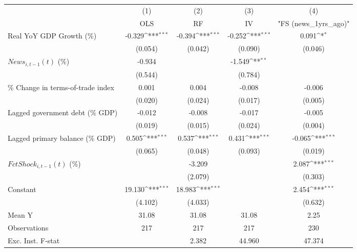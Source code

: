 {
\def\sym#1{\ifmmode^{#1}\else\(^{#1}\)\fi}
\begin{tabular}{l*{4}{c}}
\toprule
                    &\multicolumn{1}{c}{(1)}&\multicolumn{1}{c}{(2)}&\multicolumn{1}{c}{(3)}&\multicolumn{1}{c}{(4)}\\
                    &\multicolumn{1}{c}{OLS}&\multicolumn{1}{c}{RF}&\multicolumn{1}{c}{IV}&\multicolumn{1}{c}{ "FS (news_1yrs_ago)" }\\
\midrule
Real YoY GDP Growth (\%)&      -0.329\sym{***}&      -0.394\sym{***}&      -0.252\sym{***}&       0.091\sym{*}  \\
                    &     (0.054)         &     (0.042)         &     (0.090)         &     (0.046)         \\
\addlinespace
$ News_{i,t-1}(t)$ (\%)&      -0.934         &                     &      -1.549\sym{**} &                     \\
                    &     (0.544)         &                     &     (0.784)         &                     \\
\addlinespace
\% Change in terms-of-trade index&       0.001         &       0.004         &      -0.008         &      -0.006         \\
                    &     (0.020)         &     (0.024)         &     (0.017)         &     (0.005)         \\
\addlinespace
Lagged government debt (\% GDP)&      -0.012         &      -0.008         &      -0.017         &      -0.005         \\
                    &     (0.019)         &     (0.015)         &     (0.024)         &     (0.004)         \\
\addlinespace
Lagged primary balance (\% GDP)&       0.505\sym{***}&       0.537\sym{***}&       0.431\sym{***}&      -0.065\sym{***}\\
                    &     (0.065)         &     (0.048)         &     (0.093)         &     (0.019)         \\
\addlinespace
$ FctShock_{i,t-1}(t)$ (\%)&                     &      -3.209         &                     &       2.087\sym{***}\\
                    &                     &     (2.079)         &                     &     (0.303)         \\
\addlinespace
Constant            &      19.130\sym{***}&      18.983\sym{***}&                     &       2.454\sym{***}\\
                    &     (4.102)         &     (4.033)         &                     &     (0.632)         \\
\midrule
Mean Y              &       31.08         &       31.08         &       31.08         &        2.25         \\
Observations        &         217         &         217         &         217         &         230         \\
Exc. Inst. F-stat   &                     &       2.382         &      44.960         &      47.374         \\
\bottomrule
\end{tabular}
}
